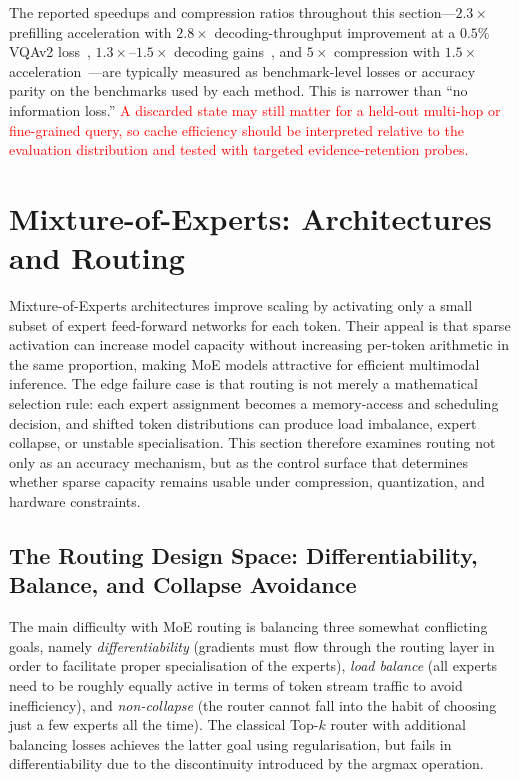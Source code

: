 \documentclass[10pt]{article}
\begin{document}
The reported speedups and compression ratios throughout this section---$2.3\!\times$
prefilling acceleration with $2.8\!\times$ decoding-throughput improvement at a $0.5\%$
VQAv2 loss~\citep{he2024zipvlefficientlargevisionlanguage},
$1.3\!\times$--$1.5\!\times$ decoding gains~\citep{li2025madakvadaptivemodalityperceptionkv}, and $5\!\times$ compression
with $1.5\!\times$ acceleration~\citep{liu2026retentivekvstatespacememoryuncertaintyaware}---are typically measured as
benchmark-level losses or accuracy parity on the benchmarks used by each method.  This
is narrower than ``no information loss.''  \textcolor{red}{A discarded state may still
matter for a held-out multi-hop or fine-grained query, so cache efficiency should be
interpreted relative to the evaluation distribution and tested with targeted
evidence-retention probes.}

\section{Mixture-of-Experts: Architectures and Routing}
\label{sec:moe}

Mixture-of-Experts architectures improve scaling by activating only a small subset of
expert feed-forward networks for each token.  Their appeal is that sparse activation can
increase model capacity without increasing per-token arithmetic in the same proportion,
making MoE models attractive for efficient multimodal inference.  The edge failure case
is that routing is not merely a mathematical selection rule: each
expert assignment becomes a memory-access and scheduling decision, and shifted token
distributions can produce load imbalance, expert collapse, or unstable specialisation.
This section therefore examines routing not only as an accuracy mechanism, but as the
control surface that determines whether sparse capacity remains usable under
compression, quantization, and hardware constraints.

\subsection{The Routing Design Space: Differentiability, Balance, and Collapse Avoidance}

The main difficulty with MoE routing is balancing three somewhat conflicting goals,
namely \emph{differentiability} (gradients must flow through the routing layer in order
to facilitate proper specialisation of the experts), \emph{load balance} (all experts need
to be roughly equally active in terms of token stream traffic to avoid inefficiency),
and \emph{non-collapse} (the router cannot fall into the habit of choosing just a few
experts all the time).  The classical Top-$k$ router with additional balancing losses
achieves the latter goal using regularisation, but fails in differentiability due to
the discontinuity introduced by the argmax operation.
\end{document}
